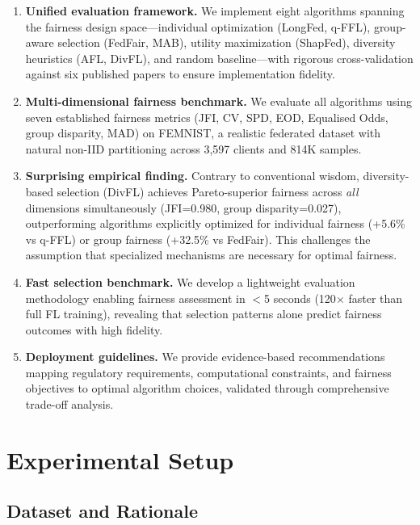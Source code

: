 \documentclass{article}
\begin{document}
\begin{enumerate}
\item \textbf{Unified evaluation framework.} We implement eight algorithms spanning the fairness design space—individual optimization (LongFed, q-FFL), group-aware selection (FedFair, MAB), utility maximization (ShapFed), diversity heuristics (AFL, DivFL), and random baseline—with rigorous cross-validation against six published papers to ensure implementation fidelity.

\item \textbf{Multi-dimensional fairness benchmark.} We evaluate all algorithms using seven established fairness metrics (JFI, CV, SPD, EOD, Equalised Odds, group disparity, MAD) on FEMNIST, a realistic federated dataset with natural non-IID partitioning across 3,597 clients and 814K samples.

\item \textbf{Surprising empirical finding.} Contrary to conventional wisdom, diversity-based selection (DivFL) achieves Pareto-superior fairness across \emph{all} dimensions simultaneously (JFI=0.980, group disparity=0.027), outperforming algorithms explicitly optimized for individual fairness (+5.6\% vs q-FFL) or group fairness (+32.5\% vs FedFair). This challenges the assumption that specialized mechanisms are necessary for optimal fairness.

\item \textbf{Fast selection benchmark.} We develop a lightweight evaluation methodology enabling fairness assessment in $<$5 seconds (120$\times$ faster than full FL training), revealing that selection patterns alone predict fairness outcomes with high fidelity.

\item \textbf{Deployment guidelines.} We provide evidence-based recommendations mapping regulatory requirements, computational constraints, and fairness objectives to optimal algorithm choices, validated through comprehensive trade-off analysis.
\end{enumerate}

\section{Experimental Setup}

\subsection{Dataset and Rationale}
\end{document}
